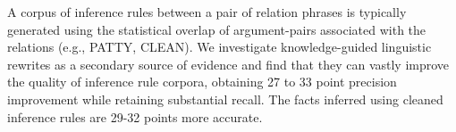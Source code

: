 A corpus of inference rules between a pair of relation phrases is typically generated using the statistical overlap of argument-pairs associated with the relations (e.g., PATTY, CLEAN). We investigate knowledge-guided linguistic rewrites as a secondary source of evidence and find that they can vastly improve the quality of inference rule corpora, obtaining 27 to 33 point precision improvement while retaining substantial recall. The facts inferred using cleaned inference rules are 29-32 points more accurate.
